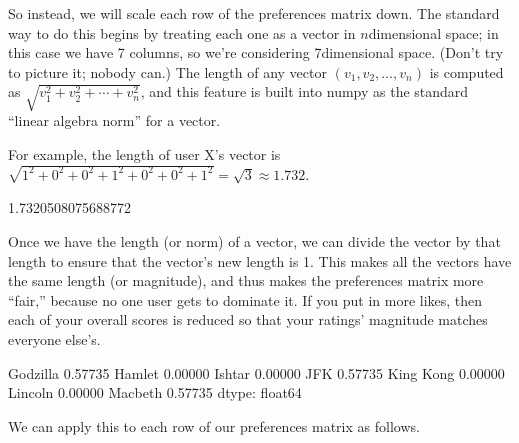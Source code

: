 \documentclass[letterpaper,10pt,english]{sphinxmanual}
\begin{document}
So instead, we will scale each row of the preferences matrix down.  The standard way to do this begins by treating each one as a vector in \(n\)\sphinxhyphen{}dimensional space; in this case we have 7 columns, so we’re considering 7\sphinxhyphen{}dimensional space.  (Don’t try to picture it; nobody can.)  The length of any vector \((v_1,v_2,\ldots,v_n)\) is computed as \(\sqrt{v_1^2+v_2^2+\cdots+v_n^2}\), and this feature is built into numpy as the standard “linear algebra norm” for a vector.

For example, the length of user X’s vector is \(\sqrt{1^2+0^2+0^2+1^2+0^2+0^2+1^2}=\sqrt{3}\approx1.732\).

\begin{sphinxVerbatim}[commandchars=\\\{\}]
   
  
\end{sphinxVerbatim}

\begin{sphinxVerbatim}[commandchars=\\\{\}]
1.7320508075688772
\end{sphinxVerbatim}

Once we have the length (or norm) of a vector, we can divide the vector by that length to ensure that the vector’s new length is 1.  This makes all the vectors have the same length (or magnitude), and thus makes the preferences matrix more “fair,” because no one user gets to dominate it.  If you put in more likes, then each of your overall scores is reduced so that your ratings’ magnitude matches everyone else’s.

\begin{sphinxVerbatim}[commandchars=\\\{\}]
      
\end{sphinxVerbatim}

\begin{sphinxVerbatim}[commandchars=\\\{\}]
Godzilla     0.57735
Hamlet       0.00000
Ishtar       0.00000
JFK          0.57735
King Kong    0.00000
Lincoln      0.00000
Macbeth      0.57735
dtype: float64
\end{sphinxVerbatim}

We can apply this to each row of our preferences matrix as follows.
\end{document}
